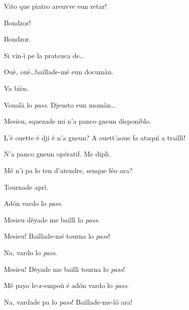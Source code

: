 \begin{drama}

\Sandrinospeaks Vito que piatro areuvve eun retar!



\Genespeaks {} Bondzor!

\Sandrinospeaks Bondzor.

\Genespeaks Si vin-ì pe la prateuca de\ldots

\Sandrinospeaks  Ouè, ouè\ldots baillade-mé eun documàn.

\Genespeaks Va bièn.


\Sandrinospeaks Voualà lo \textit{pass}. Djeusto eun momàn\ldots


\Sandrinospeaks{} Mesieu, squezade mi n’a panco gneun disponiblo.

\Genespeaks L'è ouette é dji é n'a gneun? A ouett'aoue fa ataquì a traillì!

\Sandrinospeaks N'a panco gneun opératif. Me diplì.

\Genespeaks{} Mé n'i pa lo ten d'atendre, senque féo ara?

\Sandrinospeaks Tournade aprì.

\Genespeaks Ad\'on vardo lo \textit{pass}.

\Sandrinospeaks Mesieu dèyade me baillì lo \textit{pass}. 


\Sandrinospeaks{} Mesieu! Baillade-mé tourna lo \textit{pass}!

\Genespeaks Na, vardo lo \textit{pass}.

\Sandrinospeaks{} Mesieu! Dèyade me baillì tourna lo \textit{pass}!

\Genespeaks Mé payo le-z-empoù é ad\'on vardo lo \textit{pass}.

\Sandrinospeaks{} Na, vardade pa lo \textit{pass}! Baillade-me-l\'o ara! 


\end{drama}
